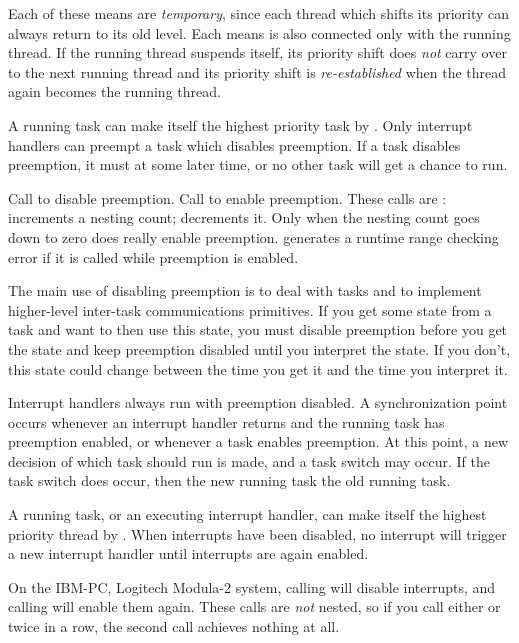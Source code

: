 Each of these means are {\em temporary\/}, since each thread which shifts its
priority can always return to its old level.  Each means is also connected
only with the running thread.  If the running thread suspends itself, its
priority shift does {\em not\/} carry over to the next running thread and
its priority shift is {\em re-established\/} when the thread again
becomes the running thread.

A running task can make itself the highest priority task by
.  Only interrupt handlers can preempt a task
which disables preemption.  If a task disables preemption, it must
 at some later time, or no other task will get a
chance to run.

Call  to disable preemption.  Call
 to enable preemption.  These calls are
:  increments a nesting
count;  decrements it.  Only when the
nesting count goes down to zero does  really
enable preemption.   generates a runtime
range checking error if it is called while preemption is enabled.

The main use of disabling preemption is to deal with tasks and to implement
higher-level inter-task communications primitives.  If you get some state
from a task and want to then use this state, you must disable preemption
before you get the state and keep preemption disabled until you interpret
the state.  If you don't, this state could change between the time you get
it and the time you interpret it.

Interrupt handlers always run with preemption disabled.  A synchronization
point occurs whenever an interrupt handler returns and the running task has
preemption enabled, or whenever a task enables preemption.  At this point,
a new decision of which task should run is made, and a task switch may
occur.  If the task switch does occur, then the new running task
 the old running task.

A running task, or an executing interrupt handler, can make itself the highest
priority thread by .  When interrupts have been
disabled, no interrupt will trigger a new interrupt handler until interrupts
are again enabled.

On the IBM-PC, Logitech Modula-2 system, calling  will
disable interrupts, and calling  will enable them again.
These calls are {\em not\/} nested, so if you call either 
or  twice in a row, the second
call achieves nothing at all. 


